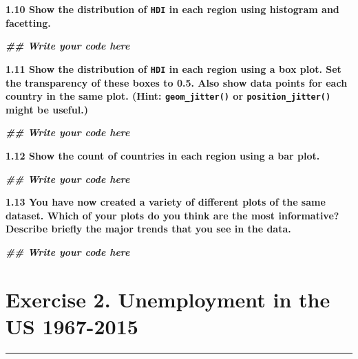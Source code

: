 \documentclass[
]{article}
\newenvironment{Shaded}{\begin{snugshade}}{\end{snugshade}}
\newcommand{\DocumentationTok}[1]{\textcolor[rgb]{0.56,0.35,0.01}{\textbf{\textit{#1}}}}
\begin{document}
\textbf{1.10 Show the distribution of \texttt{HDI} in each region using
histogram and facetting.}

\begin{Shaded}
\begin{Highlighting}[]
\DocumentationTok{\#\# Write your code here}
\end{Highlighting}
\end{Shaded}

\textbf{1.11 Show the distribution of \texttt{HDI} in each region using
a box plot. Set the transparency of these boxes to 0.5. Also show data
points for each country in the same plot. (Hint: \texttt{geom\_jitter()}
or \texttt{position\_jitter()} might be useful.)}

\begin{Shaded}
\begin{Highlighting}[]
\DocumentationTok{\#\# Write your code here}
\end{Highlighting}
\end{Shaded}

\textbf{1.12 Show the count of countries in each region using a bar
plot.}

\begin{Shaded}
\begin{Highlighting}[]
\DocumentationTok{\#\# Write your code here}
\end{Highlighting}
\end{Shaded}

\textbf{1.13 You have now created a variety of different plots of the
same dataset. Which of your plots do you think are the most informative?
Describe briefly the major trends that you see in the data.}

\begin{Shaded}
\begin{Highlighting}[]
\DocumentationTok{\#\# Write your code here}
\end{Highlighting}
\end{Shaded}

\section{\texorpdfstring{\textbf{Exercise 2. Unemployment in the US
1967-2015}}{Exercise 2. Unemployment in the US 1967-2015}}\label{exercise-2.-unemployment-in-the-us-1967-2015}

\begin{center}\rule{0.5\linewidth}{0.5pt}\end{center}
\end{document}
